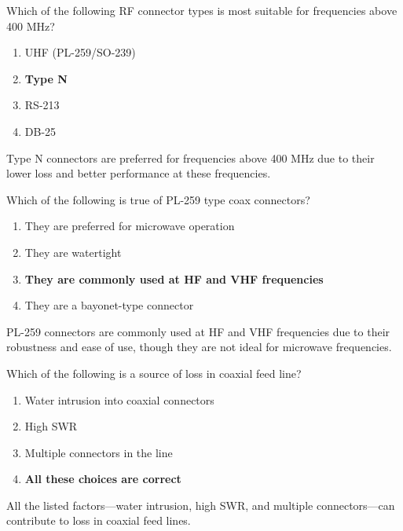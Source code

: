 
\begin{tcolorbox}[colback=gray!10!white,colframe=black!75!black,title={T9B06}]
    Which of the following RF connector types is most suitable for frequencies above 400 MHz?
    \begin{enumerate}[label=\Alph*,noitemsep]
        \item UHF (PL-259/SO-239)
        \item \textbf{Type N}
        \item RS-213
        \item DB-25
    \end{enumerate}
\end{tcolorbox}
Type N connectors are preferred for frequencies above 400 MHz due to their lower loss and better performance at these frequencies.


\begin{tcolorbox}[colback=gray!10!white,colframe=black!75!black,title={T9B07}]
    Which of the following is true of PL-259 type coax connectors?
    \begin{enumerate}[label=\Alph*,noitemsep]
        \item They are preferred for microwave operation
        \item They are watertight
        \item \textbf{They are commonly used at HF and VHF frequencies}
        \item They are a bayonet-type connector
    \end{enumerate}
\end{tcolorbox}
PL-259 connectors are commonly used at HF and VHF frequencies due to their robustness and ease of use, though they are not ideal for microwave frequencies.


\begin{tcolorbox}[colback=gray!10!white,colframe=black!75!black,title={T9B08}]
    Which of the following is a source of loss in coaxial feed line?
    \begin{enumerate}[label=\Alph*,noitemsep]
        \item Water intrusion into coaxial connectors
        \item High SWR
        \item Multiple connectors in the line
        \item \textbf{All these choices are correct}
    \end{enumerate}
\end{tcolorbox}
All the listed factors—water intrusion, high SWR, and multiple connectors—can contribute to loss in coaxial feed lines.

